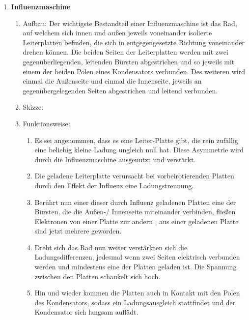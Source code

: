 \documentclass[11pt,letterpaper]{article}
\begin{document}
\begin{enumerate}
    
    \item \textbf{Influenzmaschine}
        \begin{enumerate}
            \item[] Aufbau:
                Der wichtigste Bestandteil einer Influenzmaschine ist das 
                Rad, auf welchem sich innen und außen jeweils voneinander isolierte
                Leiterplatten befinden, die sich in entgegengesetzte Richtung voneinander drehen können. 
                Die beiden Seiten der Leiterplatten werden
                mit zwei gegenüberliegenden, leitenden Bürsten abgestrichen und so jeweils 
                mit einem der beiden Polen eines Kondensators verbunden. Des weiteren 
                wird einmal die Außenseite und einmal die Innenseite, jeweils an 
                gegenübergelegenden Seiten abgestrichen und leitend verbunden. 
            \item[] Skizze:
            \item[] Funktionsweise:
            \begin{enumerate}
                \item Es sei angenommen, dass es eine Leiter-Platte gibt, die 
                rein zufällig eine beliebig kleine Ladung ungleich null hat.
                Diese Asymmetrie wird durch die Influenzmaschine 
                ausgenutzt und verstärkt.
                \item 
                Die geladene Leiterplatte verursacht bei vorbeirotierenden 
                Platten durch den Effekt der Influenz eine Ladungstrennung.
                \item 
                Berührt nun einer dieser durch Influenz geladenen Platten eine der Bürsten, die die Außen-/
                Innenseite miteinander verbinden, fließen Elektronen von einer Platte zur andern 
                , aus einer geladenen Platte sind jetzt mehrere geworden.
                \item
                Dreht sich das Rad nun weiter verstärkten sich die Ladungsdifferenzen,
                jedesmal wenn zwei Seiten elektrisch verbunden werden und mindestens eine
                der Platten geladen ist. Die Spannung zwischen den Platten schaukelt sich hoch.
                \item 
                Hin und wieder kommen die Platten auch in Kontakt mit den Polen des 
                Kondensators, sodass ein Ladungsausgleich stattfindet und der 
                Kondensator sich langsam auflädt.
            \end{enumerate}
        \end{enumerate}


\end{enumerate}
\end{document}
